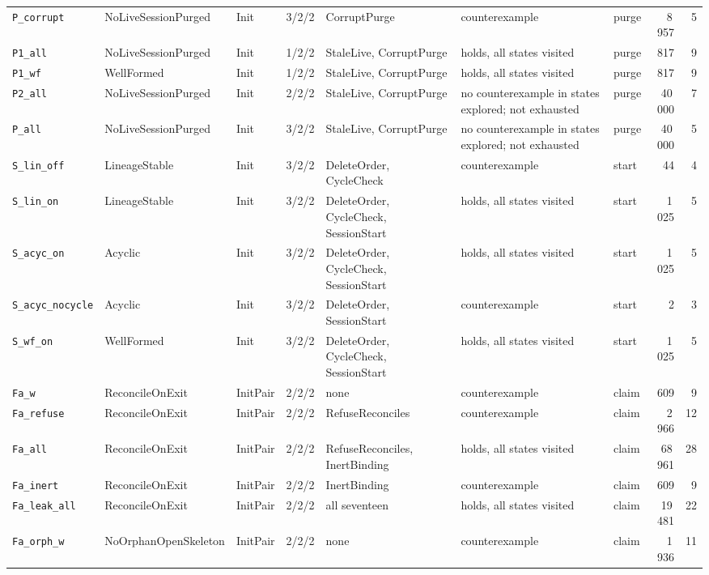 \documentclass[a4paper,10pt,fleqn]{article}
\begin{document}
{\begin{center}
\begin{tabularx}{\textwidth}{@{}l l l l X X l r r@{}}
\texttt{P\_corrupt} & NoLiveSessionPurged & Init & 3/2/2 & CorruptPurge & counterexample & purge & 8\,957 & 5 \\
\texttt{P1\_all} & NoLiveSessionPurged & Init & 1/2/2 & StaleLive, CorruptPurge & holds, all states visited & purge & 817 & 9 \\
\texttt{P1\_wf} & WellFormed & Init & 1/2/2 & StaleLive, CorruptPurge & holds, all states visited & purge & 817 & 9 \\
\texttt{P2\_all} & NoLiveSessionPurged & Init & 2/2/2 & StaleLive, CorruptPurge & no counterexample in states explored; not exhausted & purge & 40\,000 & 7 \\
\texttt{P\_all} & NoLiveSessionPurged & Init & 3/2/2 & StaleLive, CorruptPurge & no counterexample in states explored; not exhausted & purge & 40\,000 & 5 \\
\texttt{S\_lin\_off} & LineageStable & Init & 3/2/2 & DeleteOrder, CycleCheck & counterexample & start & 44 & 4 \\
\texttt{S\_lin\_on} & LineageStable & Init & 3/2/2 & DeleteOrder, CycleCheck, SessionStart & holds, all states visited & start & 1\,025 & 5 \\
\texttt{S\_acyc\_on} & Acyclic & Init & 3/2/2 & DeleteOrder, CycleCheck, SessionStart & holds, all states visited & start & 1\,025 & 5 \\
\texttt{S\_acyc\_nocycle} & Acyclic & Init & 3/2/2 & DeleteOrder, SessionStart & counterexample & start & 2 & 3 \\
\texttt{S\_wf\_on} & WellFormed & Init & 3/2/2 & DeleteOrder, CycleCheck, SessionStart & holds, all states visited & start & 1\,025 & 5 \\
\texttt{Fa\_w} & ReconcileOnExit & InitPair & 2/2/2 & none & counterexample & claim & 609 & 9 \\
\texttt{Fa\_refuse} & ReconcileOnExit & InitPair & 2/2/2 & RefuseReconciles & counterexample & claim & 2\,966 & 12 \\
\texttt{Fa\_all} & ReconcileOnExit & InitPair & 2/2/2 & RefuseReconciles, InertBinding & holds, all states visited & claim & 68\,961 & 28 \\
\texttt{Fa\_inert} & ReconcileOnExit & InitPair & 2/2/2 & InertBinding & counterexample & claim & 609 & 9 \\
\texttt{Fa\_leak\_all} & ReconcileOnExit & InitPair & 2/2/2 & all seventeen & holds, all states visited & claim & 19\,481 & 22 \\
\texttt{Fa\_orph\_w} & NoOrphanOpenSkeleton & InitPair & 2/2/2 & none & counterexample & claim & 1\,936 & 11 \\

\end{tabularx}
\end{center}}
\end{document}
